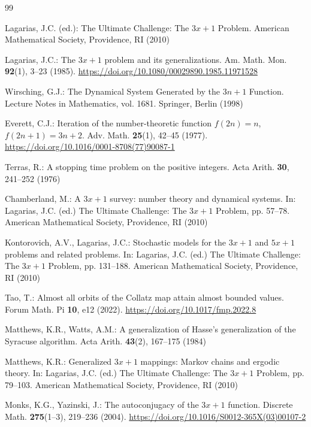 \documentclass[12pt]{article}
\theoremstyle{plain}
\theoremstyle{definition}
\theoremstyle{remark}
\theoremstyle{definition}
\begin{document}
\begin{thebibliography}{99}

Lagarias, J.C. (ed.): The Ultimate Challenge: The $3x+1$ Problem.
American Mathematical Society, Providence, RI (2010)

Lagarias, J.C.: The $3x+1$ problem and its generalizations.
Am. Math. Mon. \textbf{92}(1), 3--23 (1985).
\url{https://doi.org/10.1080/00029890.1985.11971528}

Wirsching, G.J.: The Dynamical System Generated by the $3n+1$ Function.
Lecture Notes in Mathematics, vol. 1681.
Springer, Berlin (1998)

Everett, C.J.: Iteration of the number-theoretic function
$f(2n)=n$, $f(2n+1)=3n+2$.
Adv. Math. \textbf{25}(1), 42--45 (1977).
\url{https://doi.org/10.1016/0001-8708(77)90087-1}

Terras, R.: A stopping time problem on the positive integers.
Acta Arith. \textbf{30}, 241--252 (1976)

Chamberland, M.: A $3x+1$ survey: number theory and dynamical systems.
In: Lagarias, J.C. (ed.) The Ultimate Challenge: The $3x+1$ Problem,
pp. 57--78. American Mathematical Society, Providence, RI (2010)

Kontorovich, A.V., Lagarias, J.C.: Stochastic models for the $3x+1$
and $5x+1$ problems and related problems.
In: Lagarias, J.C. (ed.) The Ultimate Challenge: The $3x+1$ Problem,
pp. 131--188. American Mathematical Society, Providence, RI (2010)

Tao, T.: Almost all orbits of the Collatz map attain almost bounded values.
Forum Math. Pi \textbf{10}, e12 (2022).
\url{https://doi.org/10.1017/fmp.2022.8}

Matthews, K.R., Watts, A.M.: A generalization of Hasse's generalization
of the Syracuse algorithm.
Acta Arith. \textbf{43}(2), 167--175 (1984)

Matthews, K.R.: Generalized $3x+1$ mappings: Markov chains and
ergodic theory.
In: Lagarias, J.C. (ed.) The Ultimate Challenge: The $3x+1$ Problem,
pp. 79--103. American Mathematical Society, Providence, RI (2010)

Monks, K.G., Yazinski, J.: The autoconjugacy of the $3x+1$ function.
Discrete Math. \textbf{275}(1--3), 219--236 (2004).
\url{https://doi.org/10.1016/S0012-365X(03)00107-2}


\end{thebibliography}
\end{document}
